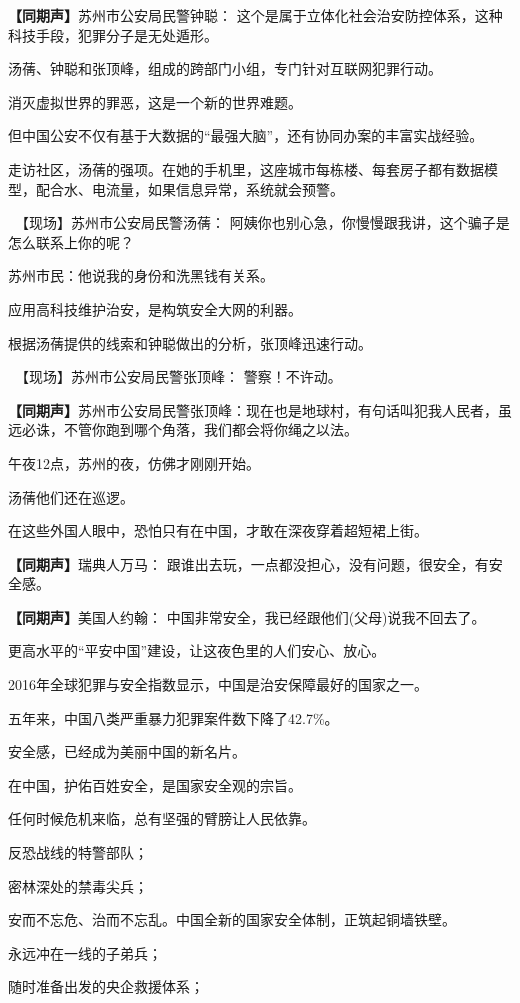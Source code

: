 \documentclass{ctexart}
\newcommand{\zkh}[1]{\textbf{\hspace{-2.7em} 【#1】}}
\begin{document}
 \zkh{同期声}苏州市公安局民警钟聪： 这个是属于立体化社会治安防控体系，这种科技手段，犯罪分子是无处遁形。

 汤蒨、钟聪和张顶峰，组成的跨部门小组，专门针对互联网犯罪行动。

 消灭虚拟世界的罪恶，这是一个新的世界难题。

 但中国公安不仅有基于大数据的``最强大脑''，还有协同办案的丰富实战经验。

走访社区，汤蒨的强项。在她的手机里，这座城市每栋楼、每套房子都有数据模型，配合水、电流量，如果信息异常，系统就会预警。

 　【现场】苏州市公安局民警汤蒨： 阿姨你也别心急，你慢慢跟我讲，这个骗子是怎么联系上你的呢？

 苏州市民：他说我的身份和洗黑钱有关系。

 应用高科技维护治安，是构筑安全大网的利器。

 根据汤蒨提供的线索和钟聪做出的分析，张顶峰迅速行动。

 　【现场】苏州市公安局民警张顶峰： 警察！不许动。

 \zkh{同期声}苏州市公安局民警张顶峰：现在也是地球村，有句话叫犯我人民者，虽远必诛，不管你跑到哪个角落，我们都会将你绳之以法。

 午夜12点，苏州的夜，仿佛才刚刚开始。

 汤蒨他们还在巡逻。

 在这些外国人眼中，恐怕只有在中国，才敢在深夜穿着超短裙上街。

 \zkh{同期声}瑞典人万马： 跟谁出去玩，一点都没担心，没有问题，很安全，有安全感。

 \zkh{同期声}美国人约翰： 中国非常安全，我已经跟他们(父母)说我不回去了。

 更高水平的``平安中国''建设，让这夜色里的人们安心、放心。

 2016年全球犯罪与安全指数显示，中国是治安保障最好的国家之一。

 五年来，中国八类严重暴力犯罪案件数下降了42.7{\%}。

 安全感，已经成为美丽中国的新名片。

 在中国，护佑百姓安全，是国家安全观的宗旨。

 任何时候危机来临，总有坚强的臂膀让人民依靠。

 反恐战线的特警部队；

 密林深处的禁毒尖兵；

 安而不忘危、治而不忘乱。中国全新的国家安全体制，正筑起铜墙铁壁。

 永远冲在一线的子弟兵；

 随时准备出发的央企救援体系；
\end{document}
